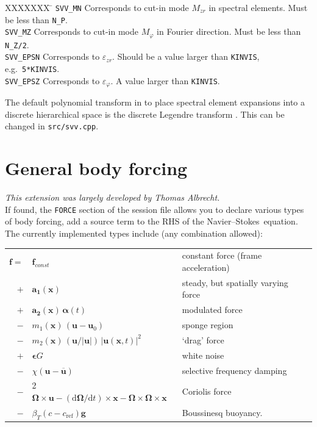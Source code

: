 \documentclass[11pt]{report}
\newcommand{\eg}{e.g.\ } \newcommand{\CC}{\mathrm{c.c.}}
\newcommand\cd{\mathrm{d}} \newcommand\cD{\mathrm{D}}
\newcommand\NavSto{Navier--Stokes}
\begin{document}
\begin{tabbing}
XXXXXXX \= \kill
\texttt{SVV\_MN} \> Corresponds to cut-in mode $M_{zr}$ in 
spectral elements. Must be less than \texttt{N\_P}.\\ 
%
\texttt{SVV\_MZ} \> Corresponds to cut-in mode $M_\varphi$ in 
Fourier direction. Must be less than \texttt{N\_Z/2}.\\
%
\texttt{SVV\_EPSN} \> Corresponds to $\varepsilon_{zr}$. 
Should be a value larger than \texttt{KINVIS}, \eg \texttt{5*KINVIS}.\\
%
\texttt{SVV\_EPSZ} \> Corresponds to $\varepsilon_\varphi$. 
A value larger than \texttt{KINVIS}.
\end{tabbing}

The default polynomial transform in to place spectral element
expansions into a discrete hierarchical space is the discrete Legendre
transform \citep[see e.g.][]{blsc03}. This can be changed in
\verb|src/svv.cpp|.


\section{General body forcing}
\label{sec.dns_ff}

\textsl{This extension was largely developed by Thomas Albrecht.}\\

\noindent
If found, the \verb+FORCE+ section of the session file allows you to
declare various types of body forcing, \ie add a source term
to the RHS of the \NavSto\ equation. The currently implemented types
include (any combination allowed):\\[1em]
\begin{tabular}{rll}
 $ \bm{f} =$ & $\bm{f}_{const}$                           
  & constant force (frame acceleration)\\
           $+$ & $\bm{a_1}(\bm{x})$                       
  & steady, but spatially varying force\\
           $+$ & $\bm{a_2}(\bm{x}) \, \bm{\alpha}(t) $ 
  & modulated force\\
           $-$ & $m_1(\bm{x})\,(\bm{u} - \bm{u}_0)$  
  & sponge region\\
           $-$ & $m_2(\bm{x})\,(\bm{u}/|\bm{u}|)\,|\bm{u}(\bm{x}, t)|^2$  
  & `drag' force  \\
           $+$ & $\bm{\epsilon} G$                        
  & white noise    \\
           $-$ & $\chi(\bm{u}-\overline{\bm{u}})$
  & selective frequency damping \\
           $-$ & 2 $\bm{\Omega} \times \bm{u} - 
                    (\cd\bm{\Omega}/\cd t) \times \bm{x} -
                    \bm{\Omega} \times \bm{\Omega} \times \bm{x}$  
  & Coriolis force \\
           $-$ & $\beta_T(c-c_\textrm{ref})\bm{g}$
  & Boussinesq buoyancy.                
\end{tabular}\\[1em]
\end{document}
